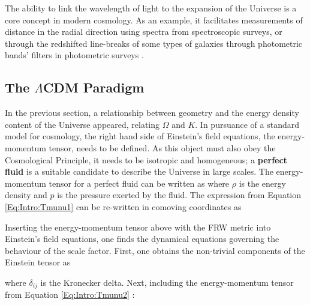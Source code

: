 \qquad The ability to link the wavelength of light to the expansion of the Universe is a core concept in modern cosmology. As an example, it facilitates measurements of distance in the radial direction using spectra from spectroscopic surveys, or through the redshifted line-breaks of some types of galaxies through photometric bands' filters in photometric surveys \citep{AbdallaPhotoZ2011,2018-redshift}.


\subsection{The $\Lambda$CDM Paradigm}\label{Sec:Intro:LCDM}
In the previous section, a relationship between geometry and the energy density content of the Universe appeared, relating $\Omega$ and $K$. In pursuance of a standard model for cosmology, the right hand side of Einstein's field equations, the energy-momentum tensor, needs to be defined. As this object must also obey the Cosmological Principle, it needs to be isotropic and homogeneous; a \textbf{perfect fluid} is a suitable candidate to describe the Universe in large scales. The energy-momentum tensor for a perfect fluid can be written as
where $\rho$ is the energy density and $p$ is the pressure exerted by the fluid. The expression from Equation \eqref{Eq:Intro:Tmunu1} can be re-written in comoving coordinates as

\qquad Inserting the energy-momentum tensor above with the FRW metric into Einstein's field equations, one finds the dynamical equations governing the behaviour of the scale factor. First, one obtains the non-trivial components of the Einstein tensor as

where $\delta_{ij}$ is the Kronecker delta. Next, including the energy-momentum tensor from Equation \eqref{Eq:Intro:Tmunu2} \citep{1922Friedmann,1924FriedmannCurvature}:

